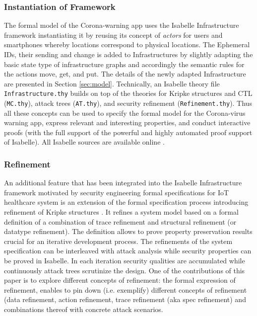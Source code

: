 \documentclass{llncs}
\begin{document}
\subsubsection{Instantiation of Framework}
The formal model of the Corona-warning app uses the Isabelle Infrastructure framework instantiating it
by reusing its concept of {\it actors} for users and smartphones whereby locations correspond
to physical locations. The Ephemeral IDs, their sending and change is added to Infrastructures
by slightly adapting the basic state type of infrastructure graphs and accordingly the semantic rules
for the actions move, get, and put. The details of the newly adapted Infrastructure are
presented in Section \ref{sec:model}.
Technically, an Isabelle theory file \texttt{Infrastructure.thy} builds on top of the theories for Kripke 
structures and CTL (\texttt{MC.thy}), attack trees (\texttt{AT.thy}), and security refinement 
(\texttt{Refinement.thy}). Thus all these concepts can be used to specify the formal model
for the Corona-virus warning app, express relevant and interesting properties, and conduct
interactive proofs (with the full support of the powerful and highly automated proof support
of Isabelle).
All Isabelle sources are available online \cite{kam:20gitsc}.

\subsubsection{Refinement}
An additional feature that has been integrated into the Isabelle Infrastructure
framework motivated by security engineering formal specifications for IoT healthcare
system is an extension of the formal specification process introducing
refinement of Kripke structures \cite{kam:19a,kam:20a}. It refines a system model based on a 
formal definition of a combination of trace refinement and structural 
refinement (or datatype refinement). The definition allows to prove property preservation results 
crucial for an iterative development process.
The refinements of the system specification  can be interleaved with attack 
analysis while security properties can be proved in Isabelle. In each iteration
security qualities are accumulated while continuously attack trees scrutinize
the design.
One of the contributions of this paper is to explore different concepts of refinement:
the formal expression of refinement, enables to pin down (i.e. exemplify) different concepts
of refinement (data refinement, action refinement, trace refinement (aka spec refinement) and
combinations thereof with concrete attack scenarios. 
\end{document}
